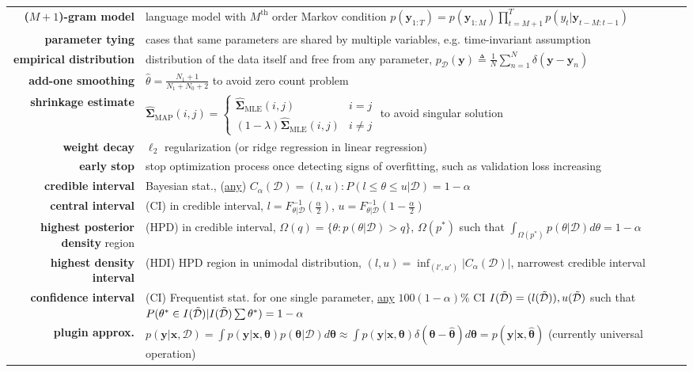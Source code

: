 \begin{table}[htpb]
{\begin{tabular}{rp{32em}}
        \textbf{($M+1$)-gram model} & language model with $M^{\text{th}}$ order Markov condition $p(\bm{y}_{1:T})=p(\bm{y}_{1:M})\prod_{t=M+1}^T{p(y_t|\bm{y}_{t-M:t-1})}$\\
        \textbf{parameter tying} & cases that same parameters are shared by multiple variables, e.g. time-invariant assumption\\
        \textbf{empirical distribution} & distribution of the data itself and free from any parameter, $p_\mathcal{D}(\bm{y})\triangleq\frac{1}{N}\sum_{n=1}^N\delta(\bm{y}-\bm{y}_n)$\\
        \textbf{add-one smoothing} & $\hat{\theta}=\frac{N_1+1}{N_1+N_0+2}$ to avoid zero count problem\\
        \textbf{shrinkage estimate} & $\hat{\bm{\Sigma}}_{\text{MAP}}(i,j)=\left\{\begin{array}{ll}
            \hat{\bm{\Sigma}}_{\text{MLE}}(i,j) & i=j \\
            (1-\lambda)\hat{\bm{\Sigma}}_{\text{MLE}}(i,j) & i\neq j
        \end{array}\right.$ to avoid singular solution\\
        \textbf{weight decay} & $\ell_2$ regularization (or ridge regression in linear regression)\\
        \textbf{early stop} & stop optimization process once detecting signs of overfitting, such as validation loss increasing\\
        \textbf{credible interval} & Bayesian stat., (\uline{any}) 
        $C_\alpha(\mathcal{D})=(l,u):P(l\leq\theta\leq u|\mathcal{D})=1-\alpha$ \\
        \textbf{central interval} & (CI) in credible interval, 
        $l=F_{\theta|\mathcal{D}}^{-1}(\frac{\alpha}{2})$,
        $u=F_{\theta|\mathcal{D}}^{-1}(1-\frac{\alpha}{2})$\\
        \textbf{highest posterior density} region & (HPD) in credible interval, 
        $\Omega(q)=\{\theta:p(\theta|\mathcal{D})>q\}$, 
        $\Omega(p^*)$ such that $\int_{\Omega(p^*)}{p(\theta|\mathcal{D})}d\theta=1-\alpha$ \\
        \textbf{highest density interval} & (HDI) HPD region in unimodal distribution, $(l,u)=\inf_{(l',u')}|C_\alpha(\mathcal{D})|$, narrowest credible interval \\
        \textbf{confidence interval} & (CI) Frequentist stat. for one single parameter, 
        \uline{any} $100(1-\alpha)\%$ CI $I(\Tilde{\mathcal{D}})=(l(\Tilde{\mathcal{D}})),u(\Tilde{\mathcal{D}})$ 
        such that $P(\theta^*\in I(\Tilde{\mathcal{D}})|I(\Tilde{\mathcal{D}})\sum\theta^*)=1-\alpha$ \\
        \textbf{plugin approx.} & $p(\bm{y}|\bm{x},\mathcal{D})
        = \int{p(\bm{y}|\bm{x},\bm{\theta})p(\bm{\theta}|\mathcal{D})}d\bm{\theta}
        \approx \int{p(\bm{y}|\bm{x},\bm{\theta})\delta(\bm{\theta}-\hat{\bm{\theta}})}d\bm{\theta}
        = p(\bm{y}|\bm{x},\hat{\bm{\theta}})$ (currently universal operation)\\
        \bottomrule
    \end{tabular}}
    \label{tab:newtermch1}
\end{table}
